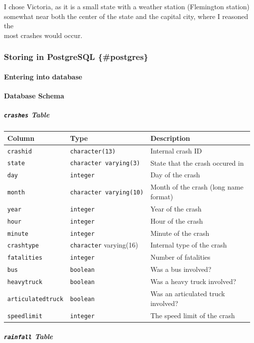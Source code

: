 \documentclass{article}
\begin{document}
I chose Victoria, as it is a small state with a weather station
(Flemington station)\\
somewhat near both the center of the state and the capital city, where I
reasoned the\\
most crashes would occur.

\subsubsection{Storing in PostgreSQL
\{\#postgres\}}\label{storing-in-postgresql-postgres}

\paragraph{Entering into database}\label{entering-into-database}

\paragraph{Database Schema}\label{database-schema}

\subparagraph{\texorpdfstring{\texttt{crashes}
Table}{crashes Table}}\label{crashes-table}

\begin{longtable}[]{@{}lll@{}}
\toprule
Column & Type & Description\tabularnewline
\midrule
\endhead
\texttt{crashid} & \texttt{character(13)} & Internal crash
ID\tabularnewline
\texttt{state} & \texttt{character\ varying(3)} & State that the crash
occured in\tabularnewline
\texttt{day} & \texttt{integer} & Day of the crash\tabularnewline
\texttt{month} & \texttt{character\ varying(10)} & Month of the crash
(long name format)\tabularnewline
\texttt{year} & \texttt{integer} & Year of the crash\tabularnewline
\texttt{hour} & \texttt{integer} & Hour of the crash\tabularnewline
\texttt{minute} & \texttt{integer} & Minute of the crash\tabularnewline
\texttt{crashtype} & \texttt{character} varying(16) & Internal type of
the crash\tabularnewline
\texttt{fatalities} & \texttt{integer} & Number of
fatalities\tabularnewline
\texttt{bus} & \texttt{boolean} & Was a bus involved?\tabularnewline
\texttt{heavytruck} & \texttt{boolean} & Was a heavy truck
involved?\tabularnewline
\texttt{articulatedtruck} & \texttt{boolean} & Was an articulated truck
involved?\tabularnewline
\texttt{speedlimit} & \texttt{integer} & The speed limit of the
crash\tabularnewline
\bottomrule
\end{longtable}

\subparagraph{\texorpdfstring{\texttt{rainfall}
Table}{rainfall Table}}\label{rainfall-table}
\end{document}

